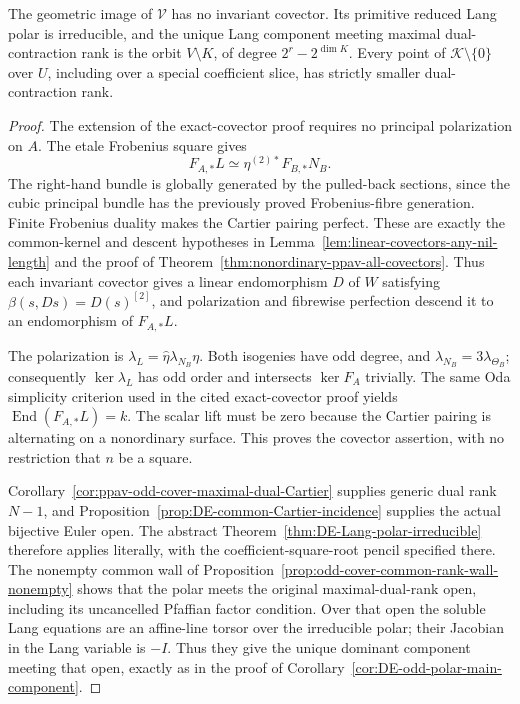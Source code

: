 \begin{proposition}
\label{prop:arbitrary-odd-cover-polar-main-orbit}
The geometric image of \(\mathcal V\) has no invariant covector.
Its primitive reduced Lang polar is irreducible, and the unique
Lang component meeting maximal dual-contraction rank is the orbit
\(V\setminus K\), of degree \(2^r-2^{\dim K}\).
Every point of \(\mathcal K\setminus\{0\}\) over \(U\),
including over a special coefficient slice, has strictly smaller
dual-contraction rank.
\end{proposition}
\begin{proof}
The extension of the exact-covector proof requires no principal
polarization on \(A\). The etale Frobenius square gives
\[
 F_{A,*}L\simeq\eta^{(2)*}F_{B,*}N_B.
\]
The right-hand bundle is globally generated by the pulled-back
sections, since the cubic principal bundle has the previously
proved Frobenius-fibre generation. Finite Frobenius duality makes
the Cartier pairing perfect. These are exactly the common-kernel
and descent hypotheses in
Lemma~\ref{lem:linear-covectors-any-nil-length} and the proof of
Theorem~\ref{thm:nonordinary-ppav-all-covectors}.
Thus each invariant covector gives a linear endomorphism \(D\)
of \(W\) satisfying \(\beta(s,Ds)=D(s)^{[2]}\), and
polarization and fibrewise perfection descend it to an endomorphism
of \(F_{A,*}L\).

The polarization is
\(\lambda_L=\widehat\eta\lambda_{N_B}\eta\).
Both isogenies have odd degree, and
\(\lambda_{N_B}=3\lambda_{\Theta_B}\); consequently
\(\ker\lambda_L\) has odd order and intersects \(\ker F_A\)
trivially. The same Oda simplicity criterion used in the cited
exact-covector proof yields \(\operatorname{End}(F_{A,*}L)=k\).
The scalar lift must be zero because the Cartier pairing is
alternating on a nonordinary surface. This proves the covector
assertion, with no restriction that \(n\) be a square.

Corollary~\ref{cor:ppav-odd-cover-maximal-dual-Cartier} supplies
generic dual rank \(N-1\), and
Proposition~\ref{prop:DE-common-Cartier-incidence} supplies the
actual bijective Euler open. The abstract
Theorem~\ref{thm:DE-Lang-polar-irreducible} therefore applies
literally, with the coefficient-square-root pencil specified there.
The nonempty common wall of
Proposition~\ref{prop:odd-cover-common-rank-wall-nonempty}
shows that the polar meets the original maximal-dual-rank open,
including its uncancelled Pfaffian factor condition. Over that open
the soluble Lang equations are an affine-line torsor over the
irreducible polar; their Jacobian in the Lang variable is \(-I\).
Thus they give the unique dominant component meeting that open,
exactly as in the proof of
Corollary~\ref{cor:DE-odd-polar-main-component}.


\end{proof}
